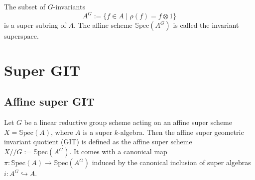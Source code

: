 \documentclass[12pt, reqno]{amsart}
\theoremstyle{plain}
\numberwithin{equation}{section}
\newcommand{\Spec}[1]{\mathbb{S}\mathrm{pec}(#1)}
\begin{document}
The subset of $G$-invariants 
$$
A^G := \{f\in A\;|\; \rho(f) = f\otimes 1\}
$$
is a super subring of $A$. The affine scheme $\Spec{A^G}$ is called the invariant superspace.

\section{Super GIT}

\subsection{Affine super GIT}
Let $G$ be a linear reductive group scheme acting on an affine super scheme $X = \Spec A$, where $A$ is a super $k$-algebra. Then the affine super geometric invariant quotient (GIT) is defined as the affine super scheme $X / \! \!/ G:= \Spec{A^G}$. It comes with a canonical map $\pi: \Spec{A} \to \Spec{A^G}$ induced by the canonical inclusion of super algebras $i: A^G \hookrightarrow A$.
\end{document}
